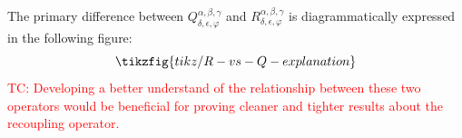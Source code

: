 \documentclass[notitlepage, 10pt]{article}
\begin{document}
The primary difference between $Q^{\alpha,\beta,\gamma}_{\delta,\epsilon,\varphi}$ and $R^{\alpha,\beta,\gamma}_{\delta,\epsilon,\varphi}$ is diagrammatically expressed in the following figure:
\begin{equation*}
    \tikzfig{tikz/R-vs-Q-explanation}
\end{equation*}
\textcolor{red}{TC: Developing a better understand of the relationship between these two operators would be beneficial for proving cleaner and tighter results about the recoupling operator.}

%
%
%
\end{document}
